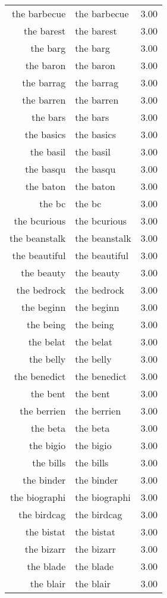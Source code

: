 \begin{table}[ht]
\begin{tabular}{rlr}
  the barbecue & the barbecue & 3.00 \\ 
  the barest & the barest & 3.00 \\ 
  the barg & the barg & 3.00 \\ 
  the baron & the baron & 3.00 \\ 
  the barrag & the barrag & 3.00 \\ 
  the barren & the barren & 3.00 \\ 
  the bars & the bars & 3.00 \\ 
  the basics & the basics & 3.00 \\ 
  the basil & the basil & 3.00 \\ 
  the basqu & the basqu & 3.00 \\ 
  the baton & the baton & 3.00 \\ 
  the bc & the bc & 3.00 \\ 
  the bcurious & the bcurious & 3.00 \\ 
  the beanstalk & the beanstalk & 3.00 \\ 
  the beautiful & the beautiful & 3.00 \\ 
  the beauty & the beauty & 3.00 \\ 
  the bedrock & the bedrock & 3.00 \\ 
  the beginn & the beginn & 3.00 \\ 
  the being & the being & 3.00 \\ 
  the belat & the belat & 3.00 \\ 
  the belly & the belly & 3.00 \\ 
  the benedict & the benedict & 3.00 \\ 
  the bent & the bent & 3.00 \\ 
  the berrien & the berrien & 3.00 \\ 
  the beta & the beta & 3.00 \\ 
  the bigio & the bigio & 3.00 \\ 
  the bills & the bills & 3.00 \\ 
  the binder & the binder & 3.00 \\ 
  the biographi & the biographi & 3.00 \\ 
  the birdcag & the birdcag & 3.00 \\ 
  the bistat & the bistat & 3.00 \\ 
  the bizarr & the bizarr & 3.00 \\ 
  the blade & the blade & 3.00 \\ 
  the blair & the blair & 3.00 \\ 

\end{tabular}
\end{table}
